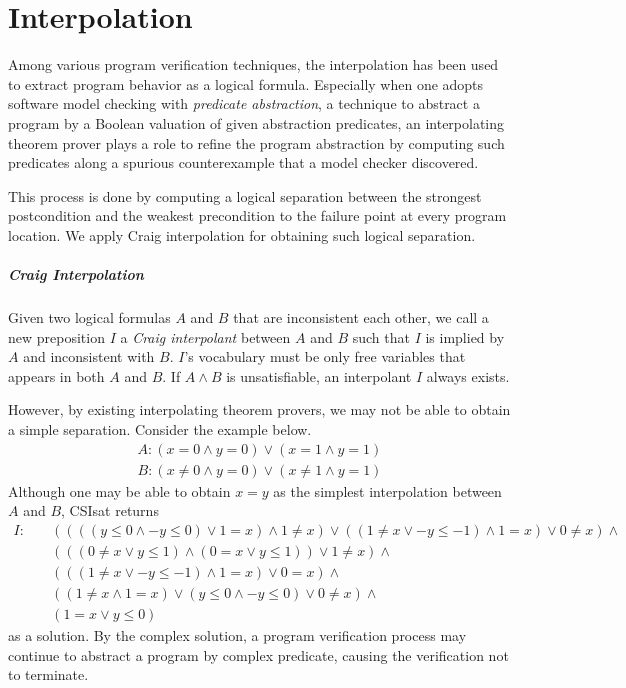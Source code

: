 \chapter{Interpolation}
\label{chap:interpolation}

Among various program verification techniques, the interpolation has
been used to extract program behavior as a logical formula.
Especially when one adopts software model checking with
\emph{predicate abstraction}, a technique to abstract a program by a
Boolean valuation of given abstraction predicates, an interpolating
theorem prover plays a role to refine the program abstraction by
computing such predicates along a spurious counterexample that a model
checker discovered.

This process is done by computing a logical separation between the
strongest postcondition and the weakest precondition to the failure
point at every program location.  We apply Craig interpolation for
obtaining such logical separation.

\paragraph{Craig Interpolation}
Given two logical formulas $A$ and $B$ that are inconsistent each
other, we call a new preposition $I$ a \emph{Craig interpolant}
\cite{journals/jsyml/Craig57} between $A$ and $B$ such that $I$ is
implied by $A$ and inconsistent with $B$.  $I$'s vocabulary must be
only free variables that appears in both $A$ and $B$.  If $A \wedge B$
is unsatisfiable, an interpolant $I$ always exists.
\vspace{10pt}

However, by existing interpolating theorem provers, we may not be able
to obtain a simple separation.  Consider the example below.
\begin{align*}
A : (x = 0 \wedge y = 0) \vee (x = 1 \wedge y = 1) \\
B : (x \neq 0 \wedge y = 0) \vee (x \neq 1 \wedge y = 1)
\end{align*}
Although one may be able to obtain $x = y$ as the simplest
interpolation between $A$ and $B$, CSIsat\cite{conf/cav/BeyerZM08}
returns
\begin{align*}
I: \quad & ((((y \leq 0 \wedge -y \leq 0) \vee 1 = x) \wedge 1 \neq x) \vee ((1 \neq x \vee -y \leq -1) \wedge 1 = x) \vee 0 \neq x) \wedge \\
& (((0 \neq x \vee y \leq 1) \wedge (0 = x \vee y \leq 1)) \vee 1 \neq x) \wedge \\
& (((1 \neq x \vee -y \leq -1) \wedge 1 = x) \vee 0 = x) \wedge \\
& ((1 \neq x \wedge 1 = x) \vee (y \leq 0 \wedge -y \leq 0) \vee 0 \neq x) \wedge \\
& (1 = x \vee y \leq 0)
\end{align*}
as a solution.  By the complex solution, a program verification
process may continue to abstract a program by complex predicate,
causing the verification not to terminate.

